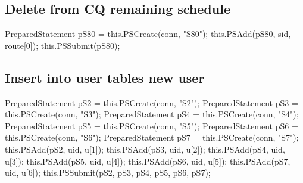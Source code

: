 \subsection{Delete from CQ remaining schedule}
\nwenddocs{}\endmoddef{}
PreparedStatement pS80 = this.PSCreate(conn, "S80");
this.PSAdd(pS80, sid, route[0]);
this.PSSubmit(pS80);
\nwendcode{}\nwdocspar

\subsection{Insert into user tables new user}
\nwenddocs{}\endmoddef{}
PreparedStatement pS2 = this.PSCreate(conn, "S2");
PreparedStatement pS3 = this.PSCreate(conn, "S3");
PreparedStatement pS4 = this.PSCreate(conn, "S4");
PreparedStatement pS5 = this.PSCreate(conn, "S5");
PreparedStatement pS6 = this.PSCreate(conn, "S6");
PreparedStatement pS7 = this.PSCreate(conn, "S7");
this.PSAdd(pS2, uid, u[1]);
this.PSAdd(pS3, uid, u[2]);
this.PSAdd(pS4, uid, u[3]);
this.PSAdd(pS5, uid, u[4]);
this.PSAdd(pS6, uid, u[5]);
this.PSAdd(pS7, uid, u[6]);
this.PSSubmit(pS2, pS3, pS4, pS5, pS6, pS7);
\nwendcode{}\nwdocspar

